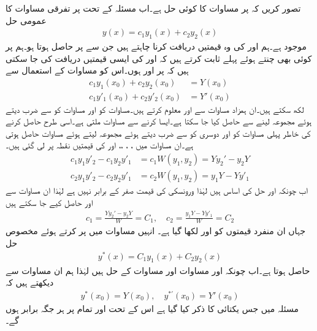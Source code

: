 تصور کریں کہ  پر مساوات  کا   کوئی حل ہے۔اب مسئلہ  کے تحت  پر  تفرقی مساوات  کا عمومی حل
\begin{align}\label{مساوات_سادہ_دو_ثبوت_مسئلہ_چار_الف}
y(x)=c_1y_1(x)+c_2y_2(x)
\end{align}
موجود ہے۔ہم  اور  کی وہ قیمتیں دریافت کرنا چاہتے ہیں جن سے  پر   حاصل ہوتا ہو۔ہم  پر کوئی بھی  چنتے ہوئے پہلے ثابت کرتے ہیں کہ  اور  کی ایسی قیمتیں دریافت کی جا سکتی ہیں کہ  پر  اور 
 ہوں۔اس کو مساوات  کے استعمال سے 
\begin{align}
c_1y_1(x_0)+c_2y_2(x_0)&=Y(x_0)\label{مساوات_سادہ_دو_ثبوت_مسئلہ_چار_ب}\\
c_1y'_1(x_0)+c_2y'_2(x_0)&=Y'(x_0)\label{مساوات_سادہ_دو_ثبوت_مسئلہ_چار_پ}
\end{align}
لکھ سکتے ہیں۔ان ہمزاد مساوات سے  اور  معلوم کرتے ہیں۔مساوات  کو  اور مساوات  کو  سے ضرب دیتے ہوئے مجموعہ لینے سے  حاصل کیا جا سکتا ہے۔ایسا کرنے سے مساوات  ملتی ہے۔اسی طرح  حاصل کرنے کی خاطر پہلی مساوات کو  اور دوسری کو  سے ضرب دیتے ہوئے مجموعہ لیتے ہوئے مساوات  حاصل ہوتی ہے۔ان مساوات میں ، ، ،،  اور  کی قیمتیں نقطہ  پر لی گئی ہیں۔ 
\begin{align}
c_1y_1y'_2-c_1y_2y'_1&=c_1W(y_1,y_2)=Yy_2'-y_2Y\label{مساوات_سادہ_دو_ثبوت_مسئلہ_چار_ت}\\
c_2y_1y'_2-c_2y_2y'_1&=c_2W(y_1,y_2)=y_1Y-Yy'_1\label{مساوات_سادہ_دو_ثبوت_مسئلہ_چار_ٹ}
\end{align}
اب چونکہ  اور  حل کی اساس ہیں لہٰذا ورونسکی کی قیمت صفر کے برابر نہیں ہے لہٰذا ان مساوات سے  اور  حاصل کیے جا سکتے ہیں
\begin{align*}
c_1=\frac{Yy_2'-y_2Y}{W}=C_1, \quad c_2=\frac{y_1Y-Yy'_1}{W}=C_2
\end{align*}
جہاں ان منفرد قیمتوں کو  اور  لکھا گیا ہے۔ انہیں مساوات  میں پر کرتے ہوئے مخصوص حل
\begin{align*}
y^*(x)=C_1y_1(x)+C_2y_2(x)
\end{align*}
حاصل ہوتا ہے۔اب چونکہ  اور  مساوات  اور مساوات  کے حل ہیں لہٰذا ہم ان مساوات سے دیکھتے ہیں کہ
\begin{align*}
y^{*}(x_0)=Y(x_0),\quad y^{*'}(x_0)=Y'(x_0)
\end{align*}
مسئلہ  میں جس یکتائی کا ذکر کیا گیا ہے اس کے تحت  اور  تمام  پر ہر جگہ برابر ہوں گے۔

